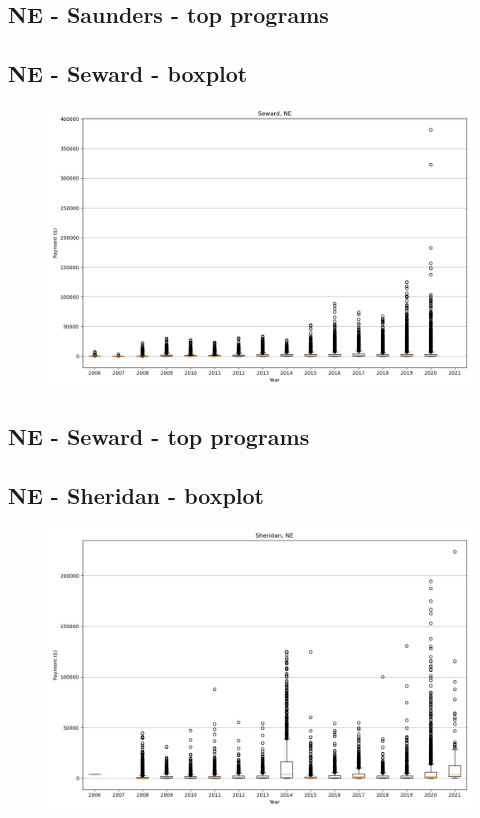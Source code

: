 \subsection*{NE - Saunders - top programs}

\newpage
\subsection*{NE - Seward - boxplot}
\begin{figure}[h]
\centering
\includegraphics[width=7in]{../output/boxplots/counties/Seward-NE_boxplot.png}
\end{figure}


\subsection*{NE - Seward - top programs}

\newpage
\subsection*{NE - Sheridan - boxplot}
\begin{figure}[h]
\centering
\includegraphics[width=7in]{../output/boxplots/counties/Sheridan-NE_boxplot.png}
\end{figure}


